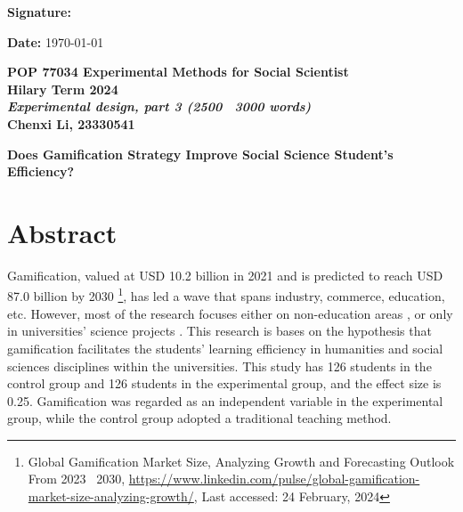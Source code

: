 \documentclass[12pt]{article} %
\begin{document}
\vspace{.7cm}


\begin{flushleft}
	\begin{minipage}{0.5\linewidth}
		\textbf{Signature:}
	\end{minipage}
\end{flushleft}

\vspace{.3cm}

\noindent \textbf{Date: } \today

\newpage
\begin{center}
	\textbf{POP 77034 Experimental Methods for Social Scientist}\\
	\textbf{Hilary Term 2024}\\
	\textbf{\textit{Experimental design, part 3 (2500 \textendash\ 3000 words)}} \\
	\vspace{.3cm}
	\textbf{Chenxi Li, 23330541}
\end{center}

\vspace{.5cm}

\noindent \textbf{Does Gamification Strategy Improve Social Science Student's Efficiency?}

\vspace{.5cm}

\section*{Abstract}

\vspace{.5cm}

\noindent Gamification, valued at USD 10.2 billion in 2021 and is predicted to reach USD 87.0 billion by 2030
\footnote[1]{
	Global Gamification Market Size, Analyzing Growth and Forecasting Outlook From 2023 \textendash\ 2030, 
	\url{https://www.linkedin.com/pulse/global-gamification-market-size-analyzing-growth/},
	Last accessed: 24 February, 2024
}, 
has led a wave that spans industry, commerce, education, etc. However, most of the research focuses either on non-education areas \citep{caponetto2014gamification}, or only in universities' science projects \citep{stott2013analysis, rabah2018gamification, putz2020can}. This research is bases on the hypothesis that gamification facilitates the students' learning efficiency in humanities and social sciences disciplines within the universities. This study has 126 students in the control group and 126 students in the experimental group, and the effect size is 0.25. Gamification was regarded as an independent variable in the experimental group, while the control group adopted a traditional teaching method.
\newpage
\end{document}
